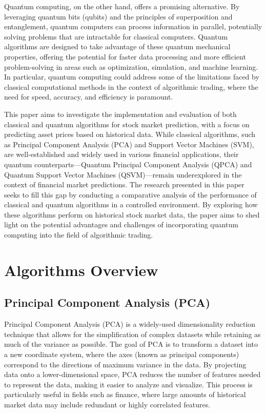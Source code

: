 \documentclass[journal]{IEEEtran}
\begin{document}
Quantum computing, on the other hand, offers a promising alternative. By leveraging quantum bits (qubits) and the principles of superposition and entanglement, quantum computers can process information in parallel, potentially solving problems that are intractable for classical computers. Quantum algorithms are designed to take advantage of these quantum mechanical properties, offering the potential for faster data processing and more efficient problem-solving in areas such as optimization, simulation, and machine learning. In particular, quantum computing could address some of the limitations faced by classical computational methods in the context of algorithmic trading, where the need for speed, accuracy, and efficiency is paramount.

This paper aims to investigate the implementation and evaluation of both classical and quantum algorithms for stock market prediction, with a focus on predicting asset prices based on historical data. While classical algorithms, such as Principal Component Analysis (PCA) and Support Vector Machines (SVM), are well-established and widely used in various financial applications, their quantum counterparts—Quantum Principal Component Analysis (QPCA) and Quantum Support Vector Machines (QSVM)—remain underexplored in the context of financial market predictions. The research presented in this paper seeks to fill this gap by conducting a comparative analysis of the performance of classical and quantum algorithms in a controlled environment. By exploring how these algorithms perform on historical stock market data, the paper aims to shed light on the potential advantages and challenges of incorporating quantum computing into the field of algorithmic trading.

\section{Algorithms Overview}
\subsection{Principal Component Analysis (PCA)}
Principal Component Analysis (PCA) is a widely-used dimensionality reduction technique that allows for the simplification of complex datasets while retaining as much of the variance as possible. The goal of PCA is to transform a dataset into a new coordinate system, where the axes (known as principal components) correspond to the directions of maximum variance in the data. By projecting data onto a lower-dimensional space, PCA reduces the number of features needed to represent the data, making it easier to analyze and visualize. This process is particularly useful in fields such as finance, where large amounts of historical market data may include redundant or highly correlated features.
\end{document}
